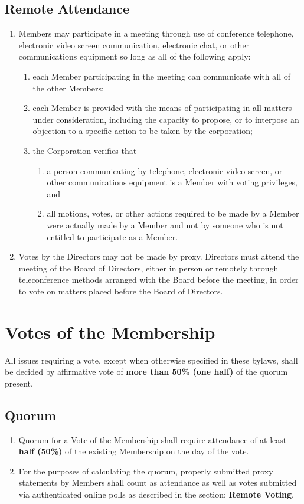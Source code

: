 \documentclass{article}
\begin{document}
\subsection{Remote Attendance}
\begin{enumerate}
    \item Members may participate in a meeting through use of conference
    telephone, electronic video screen communication, electronic chat, or other
    communications equipment so long as all of the following apply:
    \begin{enumerate}
        \item each Member participating in the meeting can communicate with all
        of the other Members;
        \item each Member is provided with the means of participating in all
        matters under consideration, including the capacity to propose, or to
        interpose an objection to a specific action to be taken by the
        corporation;
        \item the Corporation verifies that
        \begin{enumerate}
            \item a person communicating by telephone, electronic video screen,
        or other communications equipment is a Member with voting privileges,
        and
            \item all motions, votes, or other actions required to be made by a
        Member were actually made by a Member and not by someone who is not
        entitled to participate as a Member.
        \end{enumerate}
    \end{enumerate}
    \item Votes by the Directors may not be made by proxy. Directors must attend
    the meeting of the Board of Directors, either in person or remotely through
    teleconference methods arranged with the Board before the meeting, in order
    to vote on matters placed before the Board of Directors.
\end{enumerate}
\section{Votes of the Membership}
All issues requiring a vote, except when otherwise specified in these bylaws, shall be decided by affirmative vote of \textbf{more than 50\% (one half)} of the quorum present.
\subsection{Quorum}
\begin{enumerate}
\item Quorum for a Vote of the Membership shall require attendance of at least \textbf{half (50\%)} of the existing Membership on the day of the vote.
\item For the purposes of calculating the quorum, properly submitted proxy statements by Members shall count as attendance as well as votes submitted via authenticated online polls as described in the section: \textbf{Remote Voting}.
\end{enumerate}
\end{document}
